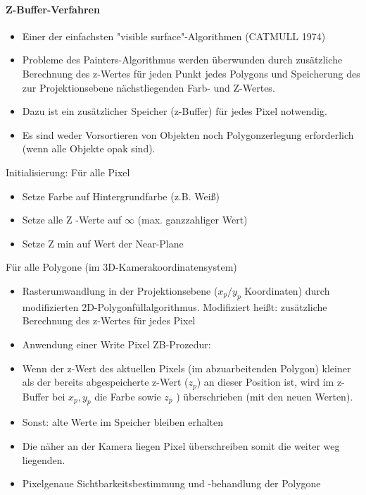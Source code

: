 \documentclass[10pt,landscape]{article}
\begin{document}
\begin{multicols}{3}
\paragraph{Z-Buffer-Verfahren}
\begin{itemize}
  \item Einer der einfachsten "visible surface"-Algorithmen (CATMULL 1974)
  \item Probleme des Painters-Algorithmus werden überwunden durch zusätzliche Berechnung des z-Wertes für jeden Punkt jedes Polygons und Speicherung des zur Projektionsebene nächstliegenden Farb- und Z-Wertes.
  \item Dazu ist ein zusätzlicher Speicher (z-Buffer) für jedes Pixel notwendig.
  \item Es sind weder Vorsortieren von Objekten noch Polygonzerlegung erforderlich (wenn alle Objekte opak sind).
\end{itemize}

Initialisierung: Für alle Pixel
\begin{itemize}
  \item Setze Farbe auf Hintergrundfarbe (z.B. Weiß)
  \item Setze alle Z -Werte auf $\infty$ (max. ganzzahliger Wert)
  \item Setze Z min auf Wert der Near-Plane
\end{itemize}

Für alle Polygone (im 3D-Kamerakoordinatensystem)
\begin{itemize}
  \item Rasterumwandlung in der Projektionsebene ($x_p/y_p$ Koordinaten) durch modifizierten 2D-Polygonfüllalgorithmus. Modifiziert heißt: zusätzliche Berechnung des z-Wertes für jedes Pixel
  \item Anwendung einer Write Pixel ZB-Prozedur:
  \item Wenn der z-Wert des aktuellen Pixels (im abzuarbeitenden Polygon) kleiner als der bereits abgespeicherte z-Wert ($z_p$) an dieser Position ist, wird im z-Buffer bei $x_p , y_p$ die Farbe sowie $z_p$ ) überschrieben (mit den neuen Werten).
  \item Sonst: alte Werte im Speicher bleiben erhalten
  \item Die näher an der Kamera liegen Pixel überschreiben somit die weiter weg liegenden.
  \item Pixelgenaue Sichtbarkeitsbestimmung und -behandlung der Polygone
\end{itemize}


\end{multicols}
\end{document}
